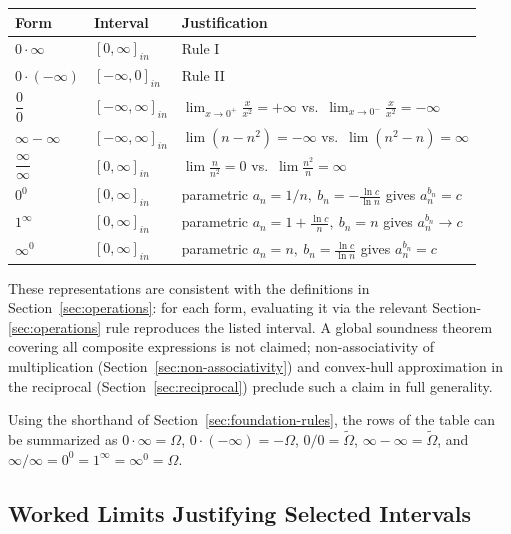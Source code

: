 \documentclass[11pt,a4paper]{article}
\theoremstyle{paperdef}
\newcommand{\inI}[1]{[#1]_{in}}
\begin{document}
\begin{center}
\renewcommand{\arraystretch}{1.35}
\begin{tabular}{@{}lll@{}}
\toprule
Form & Interval & Justification \\
\midrule
$0 \cdot \infty$ & $\inI{0, \infty}$ & Rule I \\
$0 \cdot (-\infty)$ & $\inI{-\infty, 0}$ & Rule II \\
$\dfrac{0}{0}$ & $\inI{-\infty, \infty}$
  & $\lim_{x \to 0^{+}}\tfrac{x}{x^2} = +\infty$ vs.\
    $\lim_{x \to 0^{-}}\tfrac{x}{x^2} = -\infty$ \\
$\infty - \infty$ & $\inI{-\infty, \infty}$
  & $\lim(n - n^2) = -\infty$ vs.\ $\lim(n^2 - n) = \infty$ \\
$\dfrac{\infty}{\infty}$ & $\inI{0, \infty}$
  & $\lim\tfrac{n}{n^2} = 0$ vs.\ $\lim\tfrac{n^2}{n} = \infty$ \\
$0^0$ & $\inI{0, \infty}$
  & parametric $a_n = 1/n,\ b_n = -\tfrac{\ln c}{\ln n}$
    gives $a_n^{b_n} = c$ \\
$1^\infty$ & $\inI{0, \infty}$
  & parametric $a_n = 1 + \tfrac{\ln c}{n},\ b_n = n$
    gives $a_n^{b_n} \to c$ \\
$\infty^0$ & $\inI{0, \infty}$
  & parametric $a_n = n,\ b_n = \tfrac{\ln c}{\ln n}$
    gives $a_n^{b_n} = c$ \\
\bottomrule
\end{tabular}
\end{center}

These representations are consistent with the definitions in
Section~\ref{sec:operations}: for each form, evaluating it via the
relevant Section-\ref{sec:operations} rule reproduces the listed
interval. A global soundness theorem covering all composite
expressions is not claimed; non-associativity of multiplication
(Section~\ref{sec:non-associativity}) and convex-hull approximation
in the reciprocal (Section~\ref{sec:reciprocal}) preclude such a
claim in full generality.

Using the shorthand of Section~\ref{sec:foundation-rules}, the rows
of the table can be summarized as $0 \cdot \infty = \Omega$,
$0 \cdot (-\infty) = -\Omega$, $0/0 = \widetilde{\Omega}$,
$\infty - \infty = \widetilde{\Omega}$, and
$\infty/\infty = 0^0 = 1^\infty = \infty^0 = \Omega$.

\subsection{Worked Limits Justifying Selected Intervals}
\end{document}
